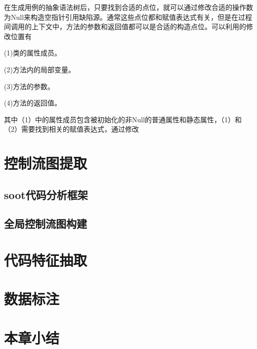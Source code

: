 在生成用例的抽象语法树后，只要找到合适的点位，就可以通过修改合适的操作数为Null来构造空指针引用缺陷源。通常这些点位都和赋值表达式有关，但是在过程间调用的上下文中，方法的参数和返回值都可以是合适的构造点位。可以利用的修改位置有

(1)类的属性成员。

(2)方法内的局部变量。

(3)方法的参数。

(4)方法的返回值。

其中（1）中的属性成员包含被初始化的非Null的普通属性和静态属性，（1）和（2）需要找到相关的赋值表达式，通过修改







\section{控制流图提取}
\subsection{soot代码分析框架}
\subsection{全局控制流图构建}
\section{代码特征抽取}
\section{数据标注}
\section{本章小结}